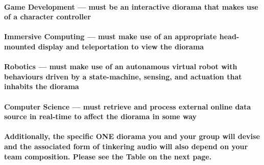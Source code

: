 \documentclass{../../fal_assignment}
\begin{document}
\paragraph{\textbf{Game Development} --- must be an interactive diorama that makes use of a character controller}

\paragraph{\textbf{Immersive Computing} --- must make use of an appropriate head-mounted display and teleportation to view the diorama}

\paragraph{\textbf{Robotics} --- must make use of an autonamous virtual robot with behaviours driven by a state-machine, sensing, and actuation that inhabits the diorama}

\paragraph{\textbf{Computer Science} --- must retrieve and process external online data source in real-time to affect the diorama in some way}

\paragraph{Additionally, the specific \textbf{ONE} diorama you and your group will devise and the associated form of tinkering audio will also depend on your team composition. Please see the Table on the next page.}
\end{document}
